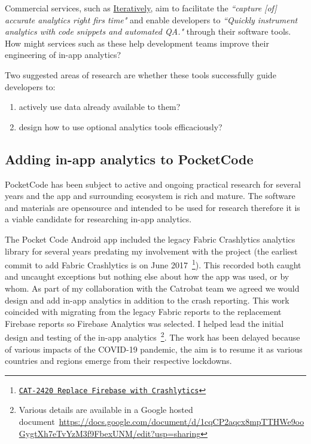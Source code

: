 Commercial services, such as \href{http://iterative.ly}{Iteratively}, aim to facilitate the \emph{``capture [of] accurate analytics right firs time"} and enable developers to \emph{``Quickly instrument analytics with code snippets and automated QA."} through their software tools. How might services such as these help development teams improve their engineering of in-app analytics? 

Two suggested areas of research are whether these tools successfully guide developers to:
\begingroup
\renewcommand{\theenumi}{\alph{enumi}}
\begin{enumerate}
    \item actively use data already available to them?
    \item design how to use optional analytics tools efficaciously?
\end{enumerate}
\endgroup


\subsection{Adding in-app analytics to PocketCode}
PocketCode has been subject to active and ongoing practical research for several years and the app and surrounding ecosystem is rich and mature. The software and materials are opensource and intended to be used for research therefore it is a viable candidate for researching in-app analytics.

The Pocket Code Android app included the legacy Fabric Crashlytics analytics library for several years predating my involvement with the project (the earliest commit to add Fabric Crashlytics is on  June 2017~\footnote{\href{https://github.com/Catrobat/Catroid/commit/95aa37ff5263402b41b63f50296aabc8c354433e}{\texttt{CAT-2420 Replace Firebase with Crashlytics}}}). This recorded both caught and uncaught exceptions but nothing else about how the app was used, or by whom. As part of my collaboration with the Catrobat team we agreed we would design and add in-app analytics in addition to the crash reporting. This work coincided with migrating from the legacy Fabric reports to the replacement Firebase reports so Firebase Analytics was selected. I helped lead the initial design and testing of the in-app analytics~\footnote{Various details are available in a Google hosted document~\url{https://docs.google.com/document/d/1cqCP2aqcx8mpTTHWe9ooGygtXh7eTvYzM3f9FbexUNM/edit?usp=sharing}}. The work has been delayed because of various impacts of the COVID-19 pandemic, the aim is to resume it as various countries and regions emerge from their respective lockdowns.


